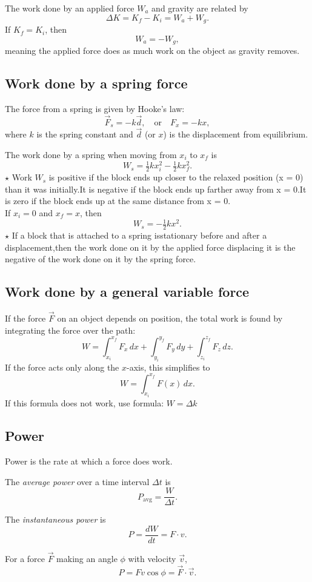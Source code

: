 The work done by an applied force $W_a$ and gravity are related by
\[
\Delta K = K_f - K_i = W_a + W_g.
\]
If $K_f = K_i$, then
\[
W_a = -W_g,
\]
meaning the applied force does as much work on the object as gravity removes.

\subsection{Work done by a spring force}

The force from a spring is given by Hooke's law:
\[
\vec{F}_s = -k\vec{d}, \quad \text{or} \quad F_x = -kx,
\]
where $k$ is the spring constant and $\vec{d}$ (or $x$) is the displacement from equilibrium.

The work done by a spring when moving from $x_i$ to $x_f$ is
\[
W_s = \tfrac{1}{2}k x_i^2 - \tfrac{1}{2}k x_f^2.
\]
$\star$ Work $W_s$
is positive if the block ends up closer to the relaxed position (x = 0) than
it was initially.It is negative if the block ends up farther away from x = 0.It is zero
if the block ends up at the same distance from x = 0.\\

If $x_i = 0$ and $x_f = x$, then
\[
W_s = -\tfrac{1}{2}kx^2.
\]
$\star$ If a block that is attached to a spring isstationary before and after a displacement,then the work done on it by the applied force displacing it is the negative
of the work done on it by the spring force. \\

\subsection{Work done by a general variable force}

If the force $\vec{F}$ on an object depends on position, the total work is found by integrating the force over the path:
\[
W = \int_{x_i}^{x_f} F_x\,dx + \int_{y_i}^{y_f} F_y\,dy + \int_{z_i}^{z_f} F_z\,dz.
\]
If the force acts only along the $x$-axis, this simplifies to
\[
W = \int_{x_i}^{x_f} F(x)\,dx.
\]
If this formula does not work, use formula: $W = \Delta k$
\\
\subsection{Power}

Power is the rate at which a force does work.

The \textit{average power} over a time interval $\Delta t$ is
\[
P_{\text{avg}} = \frac{W}{\Delta t}.
\]

The \textit{instantaneous power} is
\[
P = \frac{dW}{dt} = F \cdot v.
\]

For a force $\vec{F}$ making an angle $\phi$ with velocity $\vec{v}$,
\[
P = Fv \cos \phi = \vec{F} \cdot \vec{v}.
\]


